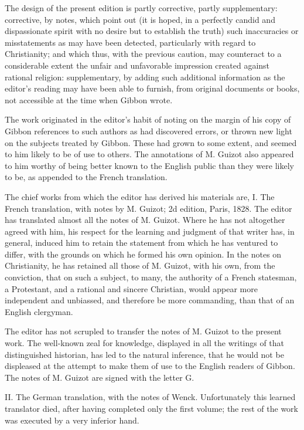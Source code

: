 The design of the present edition is partly corrective, partly supplementary:
corrective, by notes, which point out (it is hoped, in a perfectly candid
and dispassionate spirit with no desire but to establish the truth) such
inaccuracies or misstatements as may have been detected, particularly with
regard to Christianity; and which thus, with the previous caution, may
counteract to a considerable extent the unfair and unfavorable impression
created against rational religion: supplementary, by adding such additional
information as the editor’s reading may have been able to furnish, from original
documents or books, not accessible at the time when Gibbon wrote.

The work originated in the editor’s habit of noting on the margin of his copy
of Gibbon references to such authors as had discovered errors, or thrown new
light on the subjects treated by Gibbon. These had grown to some extent, and
seemed to him likely to be of use to others. The annotations of M. Guizot
also appeared to him worthy of being better known to the English public than
they were likely to be, as appended to the French translation.

The chief works from which the editor has derived his materials are, I. The
French translation, with notes by M. Guizot; 2d edition, Paris, 1828. The
editor has translated almost all the notes of M. Guizot. Where he has not
altogether agreed with him, his respect for the learning and judgment of that
writer has, in general, induced him to retain the statement from which he has
ventured to differ, with the grounds on which he formed his own opinion. In
the notes on Christianity, he has retained all those of M. Guizot, with his
own, from the conviction, that on such a subject, to many, the authority of
a French statesman, a Protestant, and a rational and sincere Christian, would
appear more independent and unbiassed, and therefore be more commanding, than
that of an English clergyman.

The editor has not scrupled to transfer the notes of M. Guizot to the present
work. The well-known zeal for knowledge, displayed in all the writings of that
distinguished historian, has led to the natural inference, that he would not
be displeased at the attempt to make them of use to the English readers of
Gibbon. The notes of M. Guizot are signed with the letter G.

II. The German translation, with the notes of Wenck. Unfortunately this learned
translator died, after having completed only the first volume; the rest of the
work was executed by a very inferior hand.

